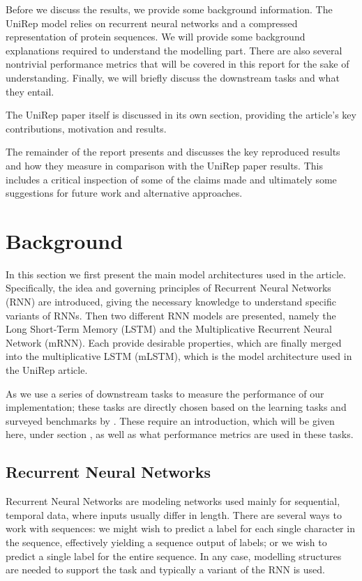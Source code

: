 \documentclass[a4paper,12pt]{article}
\begin{document}
Before we discuss the results, we provide some background information. The UniRep model relies on recurrent neural networks and a compressed representation of protein sequences. We will provide some background explanations required to understand the modelling part. There are also several nontrivial performance metrics that will be covered in this report for the sake of understanding. Finally, we will briefly discuss the downstream tasks and what they entail.

The UniRep paper itself is discussed in its own section, providing the article's key contributions, motivation and results.

The remainder of the report presents and discusses the key reproduced results and how they measure in comparison with the UniRep paper results. This includes a critical inspection of some of the claims made and ultimately some suggestions for future work and alternative approaches.


\clearpage
\section{Background}
\label{section:background}

In this section we first present the main model architectures used in the article. Specifically, the idea and governing principles of Recurrent Neural Networks (RNN) are introduced, giving the necessary knowledge to understand specific variants of RNNs. Then two different RNN models are presented, namely the Long Short-Term Memory (LSTM) and the Multiplicative Recurrent Neural Network (mRNN). Each provide desirable properties, which are finally merged into the multiplicative LSTM (mLSTM), which is the model architecture used in the UniRep article.

As we use a series of downstream tasks to measure the performance of our implementation; these tasks are directly chosen based on the learning tasks and surveyed benchmarks by \cite{tape2019}. These require an introduction, which will be given here, under section , as well as what performance metrics are used in these tasks.

\subsection{Recurrent Neural Networks}
Recurrent Neural Networks are modeling networks used mainly for sequential, temporal data, where inputs usually differ in length. 
There are several ways to work with sequences: we might wish to predict a label for each single character in the sequence, effectively yielding a sequence output of labels; or we wish to predict a single label for the entire sequence. In any case, modelling structures are needed to support the task and typically a variant of the RNN is used.
\end{document}
